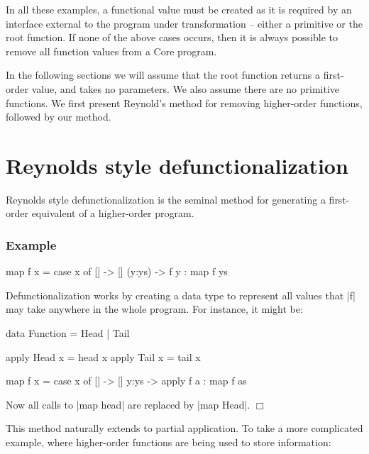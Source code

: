 \documentclass[preprint]{sigplanconf}
\let\cite=\citep
\newcounter{exmp}
\newenvironment{exampleany}[1]
    {\subsubsection*{Example #1}}
    {\hfill$\Box$}
\newenvironment{example}
    {\refstepcounter{exmp}
     \begin{exampleany}{\arabic{exmp}}}
    {\end{exampleany}}
\begin{document}
In all these examples, a functional value must be created as it is required by an interface external to the program under transformation -- either a primitive or the root function. If none of the above cases occurs, then it is always possible to remove all function values from a Core program.

In the following sections we will assume that the root function returns a first-order value, and takes no parameters. We also assume there are no primitive functions. We first present Reynold's method for removing higher-order functions, followed by our method.

\section{Reynolds style defunctionalization}

Reynolds style defunctionalization \cite{reynolds:defunc} is the seminal method for generating a first-order equivalent of a higher-order program.

\begin{example}
\begin{code}
map f x = case  x of
                []      -> []
                (y:ys)  -> f y : map f ys
\end{code}

\noindent Defunctionalization works by creating a data type to represent all values that |f| may take anywhere in the whole program. For instance, it might be:

\begin{code}
data Function = Head | Tail

apply Head  x = head  x
apply Tail  x = tail  x

map f x = case  x of
                []    -> []
                y:ys  -> apply f a : map f as
\end{code}

\noindent Now all calls to |map head| are replaced by |map Head|.
\end{example}

This method naturally extends to partial application. To take a more complicated example, where higher-order functions are being used to store information:
\end{document}
